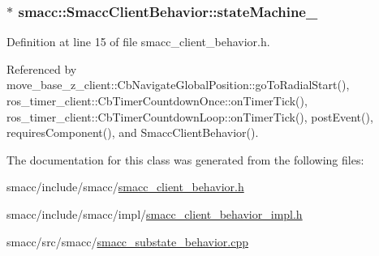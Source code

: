 \subsubsection[{\texorpdfstring{state\+Machine\+\_\+}{stateMachine_}}]{$\ast$ smacc\+::\+Smacc\+Client\+Behavior\+::state\+Machine\+\_\+}\hypertarget{classsmacc_1_1SmaccClientBehavior_a7950b5684d6de0a8e8959c0936ce9a19}{}\label{classsmacc_1_1SmaccClientBehavior_a7950b5684d6de0a8e8959c0936ce9a19}


Definition at line 15 of file smacc\+\_\+client\+\_\+behavior.\+h.



Referenced by move\+\_\+base\+\_\+z\+\_\+client\+::\+Cb\+Navigate\+Global\+Position\+::go\+To\+Radial\+Start(), ros\+\_\+timer\+\_\+client\+::\+Cb\+Timer\+Countdown\+Once\+::on\+Timer\+Tick(), ros\+\_\+timer\+\_\+client\+::\+Cb\+Timer\+Countdown\+Loop\+::on\+Timer\+Tick(), post\+Event(), requires\+Component(), and Smacc\+Client\+Behavior().



The documentation for this class was generated from the following files\+:\begin{DoxyCompactItemize}
\item 
smacc/include/smacc/\hyperlink{smacc__client__behavior_8h}{smacc\+\_\+client\+\_\+behavior.\+h}\item 
smacc/include/smacc/impl/\hyperlink{smacc__client__behavior__impl_8h}{smacc\+\_\+client\+\_\+behavior\+\_\+impl.\+h}\item 
smacc/src/smacc/\hyperlink{smacc__substate__behavior_8cpp}{smacc\+\_\+substate\+\_\+behavior.\+cpp}\end{DoxyCompactItemize}
